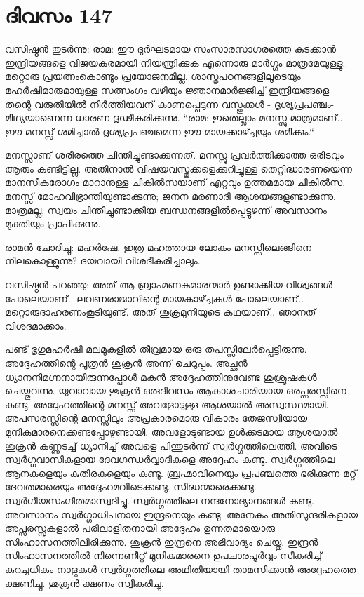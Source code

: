 \section{ദിവസം 147}


വസിഷ്ഠൻ തുടർന്നു: രാമ: ഈ ദുർഘടമായ സംസാരസാഗരത്തെ കടക്കാൻ ഇന്ദ്രിയങ്ങളെ വിജയകരമായി നിയന്ത്രിക്കുക എന്നൊരു മാർഗ്ഗം മാത്രമേയുള്ളു. മറ്റൊരു പ്രയത്നംകൊണ്ടും പ്രയോജനമില്ല. ശാസ്ത്രപഠനങ്ങളിലൂടെയും മഹർഷിമാരുമായുള്ള സത്സംഗം വഴിയും ജ്ഞാനമാർജ്ജിച്ച് ഇന്ദ്രിയങ്ങളെ തന്റെ വരുതിയിൽ നിർത്തിയവന്‌ കാണപ്പെടുന്ന വസ്തുക്കൾ - ദൃശ്യപ്രപഞ്ചം- മിഥ്യയാണെന്ന ധാരണ ദൃഢീകരിക്കുന്നു. “രാമ: ഇതെല്ലാം മനസ്സു മാത്രമാണ്‌.. ഈ മനസ്സ് ശമിച്ചാൽ ദൃശ്യപ്രപഞ്ചമെന്ന ഈ മായക്കാഴ്ച്ചയും ശമിക്കും.“

മനസ്സാണ്‌ ശരീരത്തെ ചിന്തിച്ചുണ്ടാക്കുന്നത്. മനസ്സു പ്രവർത്തിക്കാത്ത ഒരിടവും ആരും കണ്ടിട്ടില്ല. അതിനാൽ വിഷയവസ്തുക്കളെക്കുറിച്ചുള്ള തെറ്റിദ്ധാരണയെന്ന മാനസീകരോഗം മാറാനുള്ള ചികിൽസയാണ് എറ്റവും ഉത്തമമായ ചികിൽസ. മനസ്സ് മോഹവിഭ്രാന്തിയുണ്ടാക്കുന്നു; ജനന മരണാദി ആശയങ്ങളുണ്ടാക്കുന്നു. മാത്രമല്ല, സ്വയം ചിന്തിച്ചുണ്ടാക്കിയ ബന്ധനങ്ങളിൽപ്പെട്ടുഴന്ന് അവസാനം മുക്തിയും പ്രാപിക്കുന്നു.

രാമൻ ചോദിച്ചു: മഹർഷേ, ഇത്ര മഹത്തായ ലോകം മനസ്സിലെങ്ങിനെ നിലകൊള്ളുന്നു? ദയവായി വിശദീകരിച്ചാലും.

വസിഷ്ഠൻ പറഞ്ഞു: അത് ആ ബ്രാഹ്മണകുമാരന്മാർ ഉണ്ടാക്കിയ വിശ്വങ്ങൾ പോലെയാണ്‌.. ലവണരാജാവിന്റെ മായകാഴ്ച്ചകൾ പോലെയാണ്‌.. മറ്റൊരുദാഹരണംകൂടിയുണ്ട്. അത് ശുക്രമുനിയുടെ കഥയാണ്‌.. ഞാനത് വിശദമാക്കാം.

പണ്ട് ഭൃഗുമഹർഷി മലമുകളിൽ തീവ്രമായ ഒരു തപസ്സിലേർപ്പെട്ടിരുന്നു. അദ്ദേഹത്തിന്റെ പുത്രൻ ശുക്രൻ അന്ന് ചെറുപ്പം. അച്ഛൻ ധ്യാനനിമഗ്നനായിരുന്നപ്പോൾ മകൻ അദ്ദേഹത്തിനുവേണ്ട ശുശ്രൂഷകൾ ചെയ്തുവന്നു. യുവാവായ ശുക്രൻ ഒരുദിവസം ആകാശചാരിയായ ഒരപ്സരസ്സിനെ കണ്ടു. അദ്ദേഹത്തിന്റെ മനസ്സ് അവളോടുള്ള ആശയാൽ അസ്വസ്ഥമായി. അപസരസ്സിന്റെ മനസ്സിലും അപ്രകാരമൊരു വികാരം തേജസ്വിയായ മുനികുമാരനെക്കണ്ടപ്പോഴുണ്ടായി. അവളോടുണ്ടായ ഉൾക്കടമായ ആശയാൽ ശുക്രൻ കണ്ണടച്ച് ധ്യാനിച്ച് അവളെ പിന്തുടർന്ന് സ്വർഗ്ഗത്തിലെത്തി. അവിടെ സ്വർഗ്ഗവാസികളായ ദേവഗന്ധർവ്വാദികളെ അദ്ദേഹം കണ്ടു. സ്വർഗ്ഗത്തിലെ ആനകളെയും കുതിരകളെയും കണ്ടു. ബ്രഹ്മാവിനെയും പ്രപഞ്ചത്തെ ഭരിക്കുന്ന മറ്റ് ദേവതമാരെയും അദ്ദേഹമവിടെക്കണ്ടു. സിദ്ധന്മാരെക്കണ്ടു. സ്വർഗീയസംഗീതമാസ്വദിച്ചു. സ്വർഗ്ഗത്തിലെ നന്ദനോദ്യാനങ്ങൾ കണ്ടു. അവസാനം സ്വർഗ്ഗാധിപനായ ഇന്ദ്രനെയും കണ്ടു. അനേകം അതിസുന്ദരികളായ അപ്സരസ്സുകളാൽ പരിലാളിതനായി അദ്ദേഹം ഉന്നതമായൊരു സിംഹാസനത്തിലിരിക്കുന്നു. ശുക്രൻ ഇന്ദ്രനെ അഭിവാദ്യം ചെയ്തു. ഇന്ദ്രൻ സിംഹാസനത്തിൽ നിന്നെണീറ്റ് മുനികുമാരനെ ഉപചാരപൂർവ്വം സീകരിച്ച് കുറച്ചധികം നാളുകൾ സ്വർഗ്ഗത്തിലെ അഥിതിയായി താമസിക്കാൻ അദ്ദേഹത്തെ ക്ഷണിച്ചു. ശുക്രൻ ക്ഷണം സ്വീകരിച്ചു. 

